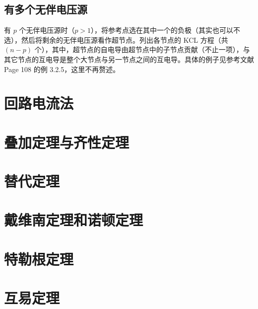 \documentclass[UTF8]{report}
\theoremstyle{MyLineTheoremStyle} %
\theoremstyle{MyBlockTheoremStyle} %
\theoremstyle{MySubsubsectionStyle} %
\begin{document}
\subsection{有多个无伴电压源}

有 $p$ 个无伴电压源时（$p>1$），将参考点选在其中一个的负极（其实也可以不选），然后将剩余的无伴电压源看作超节点。列出各节点的 KCL 方程（共 $(n-p)$ 个），其中，超节点的自电导由超节点中的子节点贡献（不止一项），与其它节点的互电导是整个大节点与另一节点之间的互电导。具体的例子见参考文献 \cite{电路原理} Page 108 的例 3.2.5，这里不再赘述。


\section{回路电流法}



\section{叠加定理与齐性定理}
\section{替代定理}
\section{戴维南定理和诺顿定理}
\section{特勒根定理}
\section{互易定理}
\end{document}
